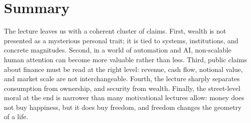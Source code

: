 \section{Summary}

The lecture leaves us with a coherent cluster of claims. First, wealth is not presented as a mysterious personal trait; it is tied to systems, institutions, and concrete magnitudes. Second, in a world of automation and AI, non-scalable human attention can become more valuable rather than less. Third, public claims about finance must be read at the right level: revenue, cash flow, notional value, and market scale are not interchangeable. Fourth, the lecture sharply separates consumption from ownership, and security from wealth. Finally, the street-level moral at the end is narrower than many motivational lectures allow: money does not buy happiness, but it does buy freedom, and freedom changes the geometry of a life.